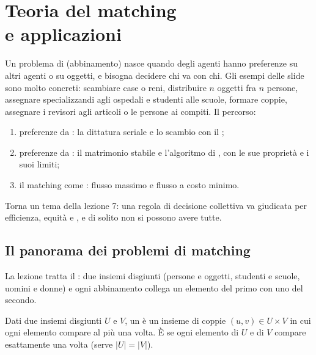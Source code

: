\chapter[Teoria del matching]{Teoria del matching\\e applicazioni}

\parteteoria

Un problema di  (abbinamento) nasce quando degli agenti hanno preferenze su
altri agenti o su oggetti, e bisogna decidere chi va con chi. Gli esempi delle slide sono
molto concreti: scambiare case o reni, distribuire $n$ oggetti fra $n$ persone, assegnare
specializzandi agli ospedali e studenti alle scuole, formare coppie, assegnare i revisori
agli articoli o le persone ai compiti. Il percorso:
\begin{enumerate}[label=\arabic*.]
  \item preferenze da : la dittatura seriale e lo scambio con il
        ;
  \item preferenze da : il matrimonio stabile e l'algoritmo di
        , con le sue proprietà e i suoi limiti;
  \item il matching come : flusso massimo e flusso a costo minimo.
\end{enumerate}
Torna un tema della lezione 7: una regola di decisione collettiva va giudicata per
efficienza, equità e , e di solito non si possono avere tutte.

\section{Il panorama dei problemi di matching}

La lezione tratta il : due insiemi disgiunti (persone e oggetti,
studenti e scuole, uomini e donne) e ogni abbinamento collega un elemento del primo con uno
del secondo.

\begin{definizione}[Matching]
Dati due insiemi disgiunti $U$ e $V$, un  è un insieme di coppie
$(u, v) \in U \times V$ in cui ogni elemento compare al più una volta. È  se
ogni elemento di $U$ e di $V$ compare esattamente una volta (serve $|U| = |V|$).
\end{definizione}

